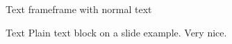 \begin{frame}{Text frame}{frame with normal text}
    \begin{block}{Text}
      Plain text block on a slide example. Very nice.
    \end{block}
\end{frame}